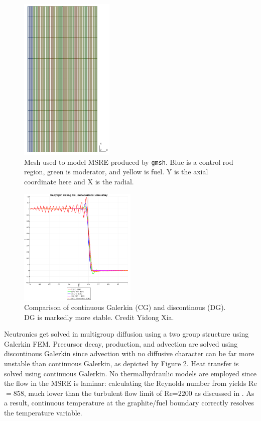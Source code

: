 \begin{figure}[ht]
\centering
\includegraphics[width=0.4\textwidth]{msre2DMesh}
\caption{Mesh used to model MSRE produced by \texttt{gmsh}. Blue is a control rod region, green is moderator, and yellow is fuel. Y is the axial coordinate here and X is the radial.}
\label{fig:msremesh}
\end{figure}

\begin{figure}
\centering
\includegraphics[width=0.5\textwidth]{xiaDG}
\caption{Comparison of continuous Galerkin (CG) and discontinous (DG). DG is markedly more stable. Credit Yidong Xia.}
\label{fig:DGISKEWL}
\end{figure}

Neutronics get solved in multigroup diffusion using a two group structure using Galerkin FEM. Precursor decay, production, and advection are solved using discontinous Galerkin since advection with no diffusive character can be far more unstable than continuous Galerkin, as depicted by Figure \ref{fig:DGISKEWL}. Heat transfer is solved using continuous Galerkin. No thermalhydraulic models are employed since the flow in the MSRE is laminar: calculating the Reynolds number from \cite{robertson_msre} yields Re$=858$, much lower than the turbulent flow limit of Re=$2200$ as discussed in \cite{schmidt_introduction_1993}. As a result, continuous temperature at the graphite/fuel boundary correctly resolves the temperature variable.

